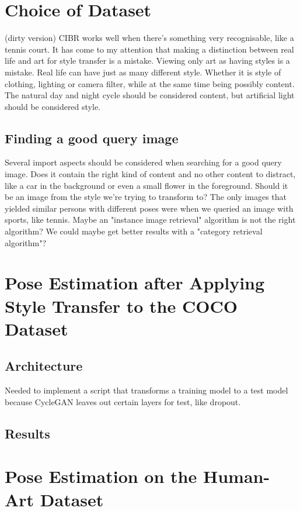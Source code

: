 \section{Choice of Dataset}
(dirty version)
CIBR works well when there's something very recognisable, like a tennis court.
It has come to my attention that making a distinction between real life and art for style transfer is a mistake.
Viewing only art as having styles is a mistake.
Real life can have just as many different style.
Whether it is style of clothing, lighting or camera filter, while at the same time being possibly content.
The natural day and night cycle should be considered content, but artificial light should be considered style.
\subsection{Finding a good query image}
Several import aspects should be considered when searching for a good query image.
Does it contain the right kind of content and no other content to distract, like a car in the background or even a small flower in the foreground.
Should it be an image from the style we're trying to transform to?
The only images that yielded similar persons with different poses were when we queried an image with sports, like tennis.
Maybe an "instance image retrieval" algorithm is not the right algorithm? We could maybe get better results with a "category retrieval algorithm"?


\section{Pose Estimation after Applying Style Transfer to the COCO Dataset}
\label{sec:baseline_coco_style_transfer}

\subsection{Architecture}
\label{sec:baseline_coco_style_transfer_architecture}
Needed to implement a script that transforms a training model to a test model because CycleGAN leaves out certain layers for test, like dropout.

\subsection{Results}
\label{sec:baseline_coco_style_transfer_results}

\section{Pose Estimation on the Human-Art Dataset}
\label{sec:baseline_human_art}

